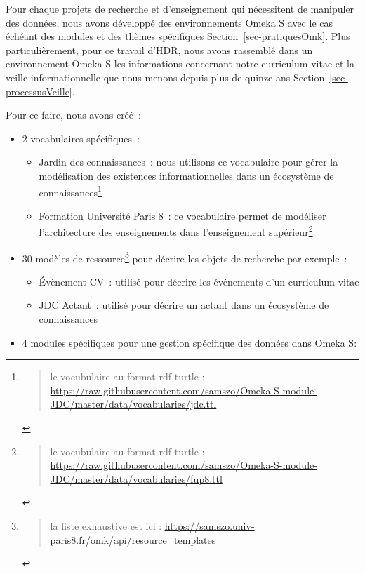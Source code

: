 \documentclass[
  a4paper,
  DIV=11,
  numbers=noendperiod]{scrreprt}
\providecommand{\tightlist}{%
  \setlength{\itemsep}{0pt}\setlength{\parskip}{0pt}}\usepackage{longtable,booktabs,array}
\begin{document}
Pour chaque projets de recherche et d'enseignement qui nécessitent de
manipuler des données, nous avons développé des environnements Omeka S
avec le cas échéant des modules et des thèmes spécifiques
Section~\ref{sec-pratiquesOmk}. Plus particulièrement, pour ce travail
d'HDR, nous avons rassemblé dans un environnement Omeka S les
informations concernant notre curriculum vitae et la veille
informationnelle que nous menons depuis plus de quinze ans
Section~\ref{sec-processusVeille}.

Pour ce faire, nous avons créé~:

\begin{itemize}
\item
  2 vocabulaires spécifiques~:

  \begin{itemize}
  \tightlist
  \item
    Jardin des connaissances~: nous utilisons ce vocabulaire pour gérer
    la modélisation des existences informationnelles dans un écosystème
    de connaissances\footnote{\begin{quote}
      le vocubulaire au format rdf turtle :
      \url{https://raw.githubusercontent.com/samszo/Omeka-S-module-JDC/master/data/vocabularies/jdc.ttl}
      \end{quote}}
  \item
    Formation Université Paris 8~: ce vocabulaire permet de modéliser
    l'architecture des enseignements dans l'enseignement
    supérieur\footnote{\begin{quote}
      le vocubulaire au format rdf turtle :
      \url{https://raw.githubusercontent.com/samszo/Omeka-S-module-JDC/master/data/vocabularies/fup8.ttl}
      \end{quote}}
  \end{itemize}
\item
  30 modèles de ressource\footnote{\begin{quote}
    la liste exhaustive est ici :
    \url{https://samszo.univ-paris8.fr/omk/api/resource_templates}
    \end{quote}} pour décrire les objets de recherche par exemple~:

  \begin{itemize}
  \tightlist
  \item
    Évènement CV~: utilisé pour décrire les événements d'un curriculum
    vitae
  \item
    JDC Actant~: utilisé pour décrire un actant dans un écosystème de
    connaissances
  \end{itemize}
\item
  4 modules spécifiques pour une gestion spécifique des données dans
  Omeka S:


\end{itemize}
\end{document}
